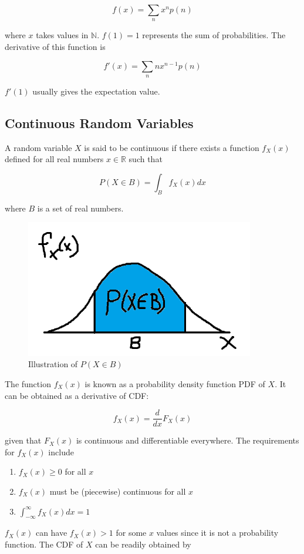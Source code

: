 $$f(x)=\sum_n x^n p(n)$$

where $x$ takes values in $\mathbb{N}$. $f(1)=1$ represents the sum of probabilities. The derivative of this function is

$$f'(x)=\sum_n nx^{n-1} p(n)$$

$f'(1)$ usually gives the expectation value.

\subsection{Continuous Random Variables}

A random variable $X$ is said to be continuous if there exists a function $f_X(x)$ defined for all real numbers $x\in\mathbb{R}$ such that

$$P(X\in B)=\int_B f_X(x) dx$$

where $B$ is a set of real numbers.

\begin{figure}[H]
	\centering
	\includegraphics[width=100mm]{12.png}
	\caption{Illustration of $P(X\in B)$}
\end{figure}

The function $f_X(x)$ is known as a probability density function PDF of $X$. It can be obtained as a derivative of CDF:

$$f_X(x)=\frac{d}{dx}F_X(x)$$

given that $F_X(x)$ is continuous and differentiable everywhere. The requirements for $f_X(x)$ include

\begin{enumerate}[i]
	\item $f_X(x) \ge 0$ for all $x$
	\item $f_X(x)$ must be (piecewise) continuous for all $x$
	\item $\displaystyle \int_{-\infty}^\infty f_X(x) dx = 1$
\end{enumerate}

$f_X(x)$ can have $f_X(x)>1$ for some $x$ values since it is not a probability function. The CDF of $X$ can be readily obtained by

